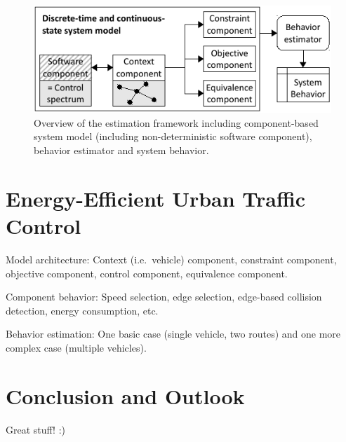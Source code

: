 \documentclass[conference]{../cls/IEEEtran}
\begin{document}
\begin{figure}[b]
	\centering
	\includegraphics{../gfx/framework.pdf}
	\caption{Overview of the estimation framework including component-based system model (including non-deterministic software component), behavior estimator and system behavior.}
	\label{figure:framework}
\end{figure}

\section{Energy-Efficient Urban Traffic Control}

Model architecture: Context (i.e.\ vehicle) component, constraint component, objective component, control component, equivalence component.

Component behavior: Speed selection, edge selection, edge-based collision detection, energy consumption, etc.

Behavior estimation: One basic case (single vehicle, two routes) and one more complex case (multiple vehicles).

\section{Conclusion and Outlook}

Great stuff! :)



\end{document}
